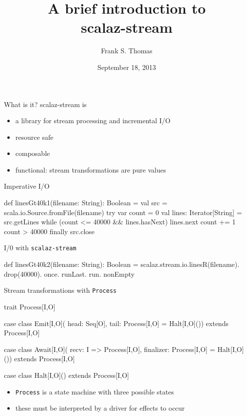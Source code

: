 \documentclass[hyperref={colorlinks=true,urlcolor=blue}]{beamer}
\title{A brief introduction to\\ scalaz-stream}
\author{Frank S. Thomas}
\date{September 18, 2013}
\begin{document}
  \frame{\titlepage}

\begin{frame}{What is it?}
  scalaz-stream is
  \begin{itemize}
    \item a library for stream processing and incremental I/O
    \item resource safe
    \item composable
    \item functional: stream transformations are pure values
  \end{itemize}
\end{frame}
 
\begin{frame}[fragile]{Imperative I/O}
  \begin{code}
def linesGt40k1(filename: String): Boolean = {
  val src = scala.io.Source.fromFile(filename)
  try {
    var count = 0
    val lines: Iterator[String] = src.getLines
    while (count <= 40000 && lines.hasNext) {
      lines.next
      count += 1
    }
    count > 40000
  }
  finally src.close
}      
  \end{code}
\end{frame}

\begin{frame}[fragile]{I/0 with \texttt{scalaz-stream}}
  \begin{code}
def linesGt40k2(filename: String): Boolean =
  scalaz.stream.io.linesR(filename).
    drop(40000).
    once.
    runLast.
    run.
    nonEmpty
  \end{code}
\end{frame}

\begin{frame}[fragile]{Stream transformations with \texttt{Process}}
  \begin{code}
trait Process[I,O]

case class Emit[I,O](
    head: Seq[O],
    tail: Process[I,O] = Halt[I,O]())
  extends Process[I,O]

case class Await[I,O](
    recv: I => Process[I,O],
    finalizer: Process[I,O] = Halt[I,O]())
  extends Process[I,O]

case class Halt[I,O]() extends Process[I,O]
  \end{code}
  
  \begin{itemize}
   \item \texttt{Process} is a state machine with three possible states
   \item these must be interpreted by a driver for effects to occur
  \end{itemize}  
\end{frame}
\end{document}
